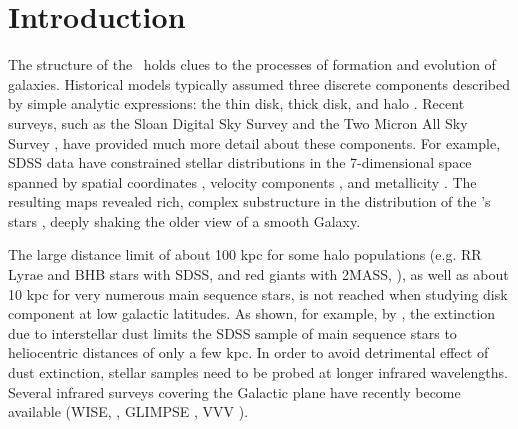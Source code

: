 \section{Introduction}

The structure of the \mw\ holds clues to the processes of formation and evolution of galaxies.
Historical models typically assumed three discrete components described by simple analytic 
expressions: the thin disk, thick disk, and halo \citep{1980ApJS...44...73B, 1989ARA&A..27..555G,1993ARA&A..31..575M}. 
Recent surveys, such as the Sloan Digital Sky Survey \citep[\sdss, ][]{2000AJ....120.1579Y} 
and the Two Micron All Sky Survey \citep[\twomass, ][]{2006AJ....131.1163S}, have provided 
much more detail about these components. For example, SDSS data have constrained stellar distributions 
in the 7-dimensional space spanned by spatial coordinates \citep{2008ApJ...673..864J}, velocity components \citep{2010ApJ...716....1B}, and metallicity \citep{2008ApJ...684..287I}. The resulting maps revealed rich, complex substructure in the distribution of the \mw's stars \citep[e.g.][]{2000AJ....120..963I,2000ApJ...540..825Y,2001ApJ...554L..33V,2002ApJ...569..245N,2003ApJ...599.1082M,2006ApJ...642L.137B,2006ApJ...651L..29G,2006AJ....132..714V}, deeply shaking the older view of a smooth Galaxy. 


The large distance limit of about 100 kpc for some halo populations (e.g. RR Lyrae and BHB stars 
with SDSS, \citealt{2010ApJ...708..717S} and red giants with 2MASS, \citealt{2003ApJ...599.1082M}), as well as about 10 kpc 
for very numerous main sequence stars, is not reached when studying disk component at low galactic
latitudes. As shown, for example, by \cite{2012ApJ...757..166B}, the extinction due to interstellar dust limits 
the SDSS sample of main sequence stars to heliocentric distances of only a few kpc. In order
to avoid detrimental effect of dust extinction, stellar samples need to be probed at longer infrared
wavelengths. Several infrared surveys covering the Galactic plane have recently become available (WISE, \citealt{2010AJ....140.1868W, 2012wise.rept....1C}, GLIMPSE \citealt{2009PASP..121..213C, 2003PASP..115..953B}, VVV \citealt{2012A&A...537A.107S}).

